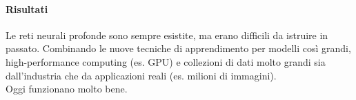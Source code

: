\documentclass[10pt]{book}
\begin{document}
\paragraph{Risultati} Le reti neurali profonde sono sempre esistite, ma erano difficili da istruire in passato. Combinando le nuove tecniche di apprendimento per modelli così grandi, high-performance computing (es. GPU) e collezioni di dati molto grandi sia dall'industria che da applicazioni reali (es. milioni di immagini).\\
Oggi funzionano molto bene.
\end{document}
